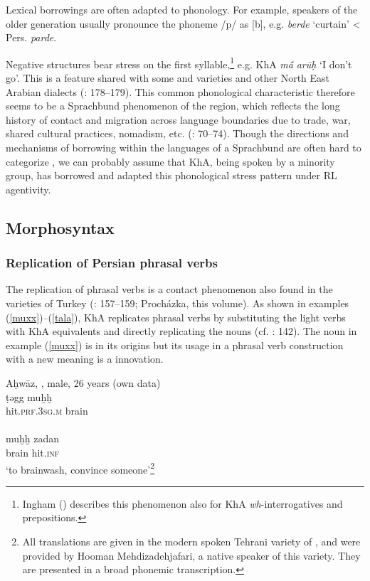 \documentclass[output=paper,nonflat]{langsci/langscibook}
\begin{document}
Lexical borrowings are often adapted to  phonology. For example, speakers of the older generation usually pronounce the {phoneme} /p/ as [b], e.g. \textit{berde} ‘curtain’ < Pers. \textit{parde}. 

Negative structures bear {stress} on the first syllable,\footnote{Ingham (\citeyear[724]{Ingham1991}) describes this phenomenon also for KhA \textit{wh}-interrogatives and {prepositions}.} e.g. KhA \textit{mā́} \textit{arūḥ} ‘I don’t go’. This is a feature shared with some  and  varieties and other North East Arabian dialects (\citealt{Ingham2005}: 178–179). This common phonological characteristic therefore seems to be a Sprachbund phenomenon of the  region, which reflects the long history of contact and migration across language boundaries due to trade, war, shared cultural practices, nomadism, etc. (\citealt{Winford2003}: 70–74). Though the directions and mechanisms of borrowing within the languages of a Sprachbund are often hard to categorize \citep[74]{Winford2003}, we can probably assume that KhA, being spoken by a minority group, has borrowed and adapted this phonological {stress} pattern under {RL} agentivity.



\subsection{Morphosyntax}
\subsubsection{Replication of Persian phrasal verbs}

The {replication} of phrasal verbs is a contact phenomenon also found in the  varieties of Turkey (\citealt{Grigore2007book}: 157–159; Procházka, this volume). As shown in examples (\ref{muxx})--(\ref{tala}), KhA replicates  phrasal verbs by substituting the  {light verbs} with KhA equivalents and directly replicating the  nouns (cf. \citealt{MatrasShabibi2007}: 142). The noun in example (\ref{muxx}) is  in its origins but its usage in a phrasal verb construction with a new meaning is a  innovation.

\ea \label{muxx}
\ea Aḥwāz, , male, 26 years (own data)\\
\gll ṭəgg muḫḫ\\
     hit.\textsc{prf}.3\textsc{sg}.\textsc{m} brain\\ 
\\
\gll muḫḫ zadan\\
     brain hit.\textsc{inf} \\
\glt ‘to brainwash, convince someone’\footnote{All  translations are given in the modern spoken Tehrani variety of , and were provided by Hooman Mehdizadehjafari, a native speaker of this variety. They are presented in a broad phonemic transcription.} 
\z
\z
\end{document}
